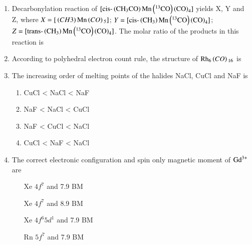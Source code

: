 \documentclass[journal,12pt,onecolumn]{IEEEtran}
\theoremstyle{remark}
\begin{document}
\begin{enumerate}
    
\item Decarbonylation reaction of $[\text{cis-}\brak{\ce{CH3CO}}\text{Mn}\brak{^{13}\ce{CO}}\brak{\ce{CO}}_4]$ yields X, Y and Z, where $X=[\ce{\brak{CH3}Mn\brak{CO}5}]$; $Y=[\text{cis-}\brak{\ce{CH3}}\text{Mn}\brak{^{13}\ce{CO}}\brak{\ce{CO}}_4]$; $Z=[\text{trans-}\brak{\ce{CH3}}\text{Mn}\brak{^{13}\ce{CO}}\brak{\ce{CO}}_4]$. The molar ratio of the products  in this reaction is
    \begin{enumerate}
        \hfill{}
    \end{enumerate}

\item According to polyhedral electron count rule, the structure of $\ce{Rh6\brak{CO}16}$ is
    \begin{enumerate}
        \hfill{}
    \end{enumerate}
    

    
\item The increasing order of melting points of the halides NaCl, CuCl and NaF is
    \begin{enumerate}
        \item CuCl < NaCl < NaF
        \item NaF < NaCl < CuCl
        \item NaF < CuCl < NaCl
        \item CuCl < NaF < NaCl
    \end{enumerate}
    \hfill{}
    

    
\item The correct electronic configuration and spin only magnetic moment of $\ce{Gd^3+}$  are
    \begin{enumerate}
        \item [Xe]$4f^7$ and 7.9 BM
        \item [Xe]$4f^7$ and 8.9 BM
        \item [Xe]$4f^6 5d^1$ and 7.9 BM
        \item [Rn]$5f^7$ and 7.9 BM
    \end{enumerate}
    \hfill{}
    


\end{enumerate}
\end{document}
